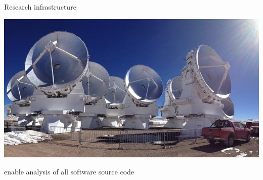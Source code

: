 \documentclass[aspectratio=169,xcolor=table]{beamer}
\begin{document}
\begin{frame}
\begin{columns}
\begin{column}{.3\columnwidth}
\begin{block}{Research infrastructure}
\begin{center}
                        \includegraphics[width=.7\linewidth]{img/atacama-telescope}
                    \end{center}
                    \alert{enable analysis} of all software source code
                \end{block}
            \end{column}
        \end{columns}
    \end{frame}

\end{document}
